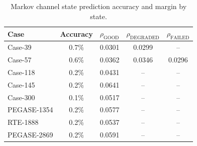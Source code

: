 \begin{table}[t]
\centering
\caption{Markov channel state prediction accuracy and margin by state.}
\label{tab:channel}
\begin{tabular}{lcccc}
\toprule
Case & Accuracy & $\rho_{\text{GOOD}}$ & $\rho_{\text{DEGRADED}}$ & $\rho_{\text{FAILED}}$ \\
\midrule
Case-39 & 0.7\% & 0.0301 & 0.0299 & -- \\
Case-57 & 0.6\% & 0.0362 & 0.0346 & 0.0296 \\
Case-118 & 0.2\% & 0.0431 & -- & -- \\
Case-145 & 0.2\% & 0.0641 & -- & -- \\
Case-300 & 0.1\% & 0.0517 & -- & -- \\
PEGASE-1354 & 0.2\% & 0.0577 & -- & -- \\
RTE-1888 & 0.2\% & 0.0537 & -- & -- \\
PEGASE-2869 & 0.2\% & 0.0591 & -- & -- \\
\bottomrule
\end{tabular}
\end{table}